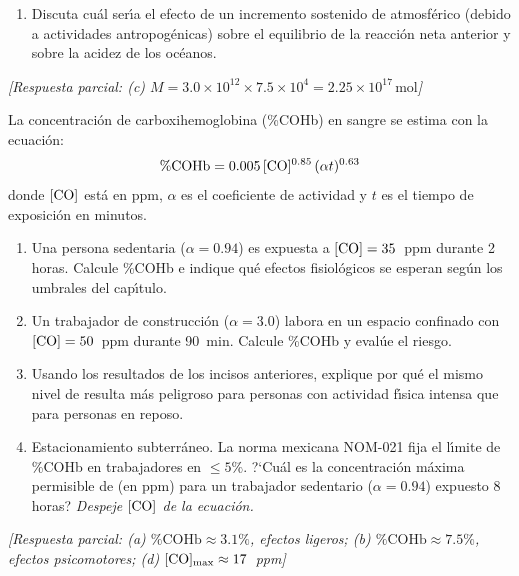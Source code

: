 \begin{bloque_ejercicios}
\begin{ejercicios}
\begin{enumerate}[label=\alph*)]
    \item Discuta cu\'al ser\'{\i}a el efecto de un incremento sostenido de
           atmosf\'erico (debido a actividades antropog\'enicas)
          sobre el equilibrio de la reacci\'on neta anterior y sobre
          la acidez de los oc\'eanos.
\end{enumerate}

\textit{[Respuesta parcial:
(c) $M = 3.0\times10^{12} \times 7.5\times10^{4}
    = 2.25\times10^{17}\,\si{\mole}$]}

\item La concentraci\'on de carboxihemoglobina (\%COHb) en sangre se
estima con la ecuaci\'on:
\[
    \%\ce{COHb} = 0.005\,[\ce{CO}]^{0.85}\,(\alpha t)^{0.63}
\]
donde $[\ce{CO}]$ est\'a en ppm, $\alpha$ es el coeficiente de actividad
y $t$ es el tiempo de exposici\'on en minutos.

\begin{enumerate}[label=\alph*)]
    \item Una persona sedentaria ($\alpha = 0.94$) es expuesta a
          $[\ce{CO}] = 35$~ppm durante 2 horas.
          Calcule \%COHb e indique qu\'e efectos fisiol\'ogicos
          se esperan seg\'un los umbrales del cap\'{\i}tulo.

    \item Un trabajador de construcci\'on ($\alpha = 3.0$) labora en un
          espacio confinado con $[\ce{CO}] = 50$~ppm durante 90~min.
          Calcule \%COHb y eval\'ue el riesgo.

    \item Usando los resultados de los incisos anteriores, explique por
          qu\'e el mismo nivel de  resulta m\'as peligroso para
          personas con actividad f\'{\i}sica intensa que para personas
          en reposo.

    \item Estacionamiento subterr\'aneo. La norma mexicana NOM-021 fija
          el l\'{\i}mite de \%COHb en trabajadores en $\leq 5\%$.
          ?`Cu\'al es la concentraci\'on m\'axima permisible de  (en ppm)
          para un trabajador sedentario ($\alpha = 0.94$) expuesto 8 horas?
          \textit{Despeje $[\ce{CO}]$ de la ecuaci\'on.}
\end{enumerate}

\textit{[Respuesta parcial:
(a) $\%\text{COHb} \approx 3.1\%$, efectos ligeros;
(b) $\%\text{COHb} \approx 7.5\%$, efectos psicomotores;
(d) $[\ce{CO}]_{\max} \approx 17$~ppm]}


\end{ejercicios}
\end{bloque_ejercicios}
